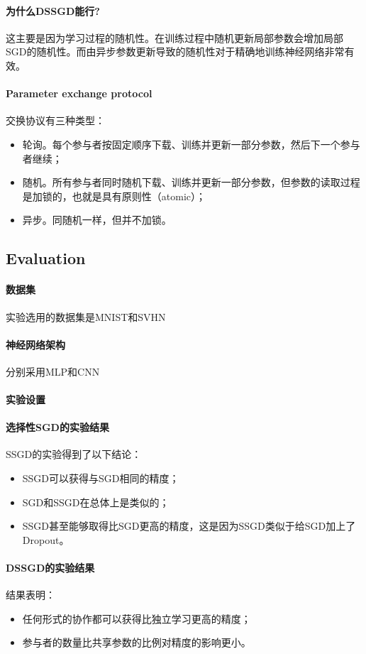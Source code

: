 \documentclass[12pt,a4paper]{article}
\begin{document}
\paragraph{为什么DSSGD能行?} 这主要是因为学习过程的随机性。在训练过程中随机更新局部参数会增加局部SGD的随机性。而由异步参数更新导致的随机性对于精确地训练神经网络非常有效。
\paragraph{Parameter exchange protocol} 交换协议有三种类型：
\begin{itemize}
	\item 轮询。每个参与者按固定顺序下载、训练并更新一部分参数，然后下一个参与者继续；
	\item 随机。所有参与者同时随机下载、训练并更新一部分参数，但参数的读取过程是加锁的，也就是具有原则性（atomic）；
	\item 异步。同随机一样，但并不加锁。
\end{itemize}
\subsection{Evaluation}
\paragraph{数据集} 实验选用的数据集是MNIST和SVHN
\paragraph{神经网络架构} 分别采用MLP和CNN
\paragraph{实验设置} 
\paragraph{选择性SGD的实验结果} SSGD的实验得到了以下结论：
\begin{itemize}
	\item SSGD可以获得与SGD相同的精度；
	\item SGD和SSGD在总体上是类似的；
	\item SSGD甚至能够取得比SGD更高的精度，这是因为SSGD类似于给SGD加上了Dropout。
\end{itemize}
\paragraph{DSSGD的实验结果} 结果表明：
\begin{itemize}
	\item 任何形式的协作都可以获得比独立学习更高的精度；
	\item 参与者的数量比共享参数的比例对精度的影响更小。
\end{itemize}
\end{document}
